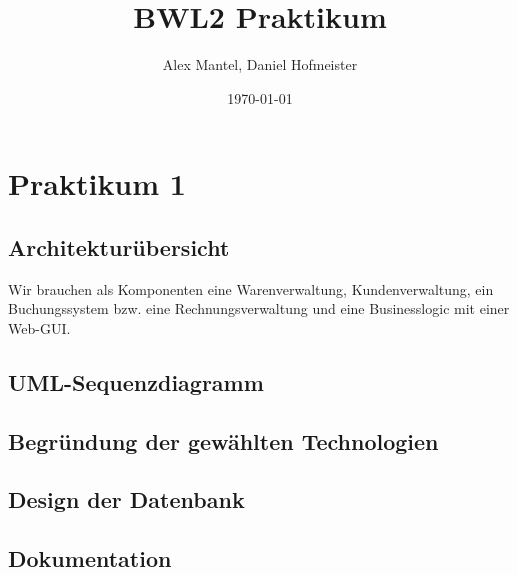 \documentclass[10pt,a4paper]{article}
\begin{document}
\title{BWL2 Praktikum}
\author{Alex Mantel, Daniel Hofmeister}
\date{\today}
\maketitle

\section{Praktikum 1}
\subsection{Architektur\"ubersicht}
Wir brauchen als Komponenten eine Warenverwaltung, Kundenverwaltung, ein Buchungssystem bzw. eine Rechnungsverwaltung und eine Businesslogic mit einer Web-GUI.

\subsection{UML-Sequenzdiagramm}				


\subsection{Begr\"undung der gew\"ahlten Technologien}

\subsection{Design der Datenbank}

\subsection{Dokumentation}
\end{document}
